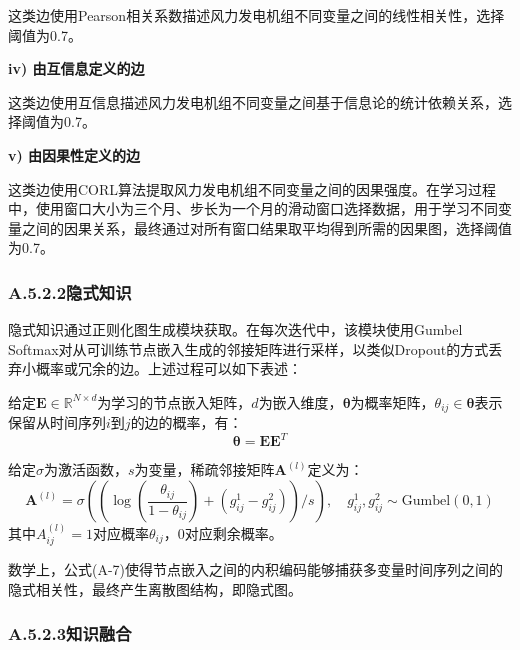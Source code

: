 这类边使用Pearson相关系数描述风力发电机组不同变量之间的线性相关性，选择阈值为0.7。

\textbf{iv) 由互信息定义的边}

这类边使用互信息描述风力发电机组不同变量之间基于信息论的统计依赖关系，选择阈值为0.7。

\textbf{v) 由因果性定义的边}

这类边使用CORL算法提取风力发电机组不同变量之间的因果强度。在学习过程中，使用窗口大小为三个月、步长为一个月的滑动窗口选择数据，用于学习不同变量之间的因果关系，最终通过对所有窗口结果取平均得到所需的因果图，选择阈值为0.7。

\subsubsection*{A.5.2.2\quad 隐式知识}

隐式知识通过正则化图生成模块获取。在每次迭代中，该模块使用Gumbel Softmax对从可训练节点嵌入生成的邻接矩阵进行采样，以类似Dropout的方式丢弃小概率或冗余的边。上述过程可以如下表述：

给定$\boldsymbol{E} \in \mathbb{R}^{N \times d}$为学习的节点嵌入矩阵，$d$为嵌入维度，$\boldsymbol{\theta}$为概率矩阵，$\theta_{ij} \in \boldsymbol{\theta}$表示保留从时间序列$i$到$j$的边的概率，有：
\begin{equation}
\boldsymbol{\theta} = \boldsymbol{E}\boldsymbol{E}^T
\end{equation}

给定$\sigma$为激活函数，$s$为变量，稀疏邻接矩阵$\boldsymbol{A}^{(l)}$定义为：
\begin{equation}
\boldsymbol{A}^{(l)} = \sigma \left( \left( \log\left(\frac{\theta_{ij}}{1-\theta_{ij}}\right) + (g_{ij}^1 - g_{ij}^2) \right) / s \right), \quad g_{ij}^1, g_{ij}^2 \sim \mathrm{Gumbel}(0, 1)
\end{equation}
其中$A_{ij}^{(l)} = 1$对应概率$\theta_{ij}$，0对应剩余概率。

数学上，公式(A-7)使得节点嵌入之间的内积编码能够捕获多变量时间序列之间的隐式相关性，最终产生离散图结构，即隐式图。

\subsubsection*{A.5.2.3\quad 知识融合}

